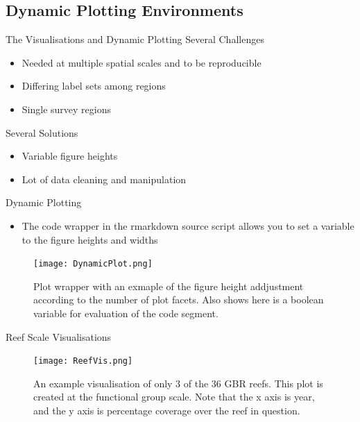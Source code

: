 \documentclass{beamer}
\begin{document}
          \subsection{Dynamic Plotting Environments}

              \begin{frame}{The Visualisations and Dynamic Plotting}
                Several Challenges
                  \begin{itemize}
                    \item Needed at multiple spatial scales and to be reproducible
                    \item Differing label sets among regions
                    \item Single survey regions
                  \end{itemize}

                  \medskip
                  
                Several Solutions
                  \begin{itemize}
                    \item Variable figure heights
                    \item Lot of data cleaning and manipulation
                  \end{itemize}
              \end{frame}

              \begin{frame}{Dynamic Plotting}
                \begin{itemize}
                  \item The code wrapper in the rmarkdown source script allows you to set a variable to the figure heights and widths
                \end{itemize}

                \begin{figure}
                    \centering
                    \texttt{[image: DynamicPlot.png]}
                    \caption{Plot wrapper with an exmaple of the figure height addjustment according to the number of plot facets. Also shows here is a boolean variable for evaluation of the code segment. }
                \end{figure}
              \end{frame}

              \begin{frame}{Reef Scale Visualisations}
                \begin{figure}
                    \centering
                    \texttt{[image: ReefVis.png]}
                    \caption{An example visualisation of only 3 of the 36 GBR reefs. This plot is created at the functional group scale. Note that the x axis is year, and the y axis is percentage coverage over the reef in question. }
                \end{figure}
             \end{frame}
\end{document}

